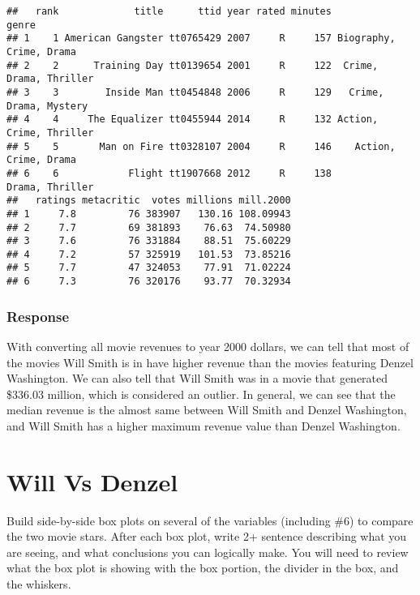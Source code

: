 \documentclass[
]{article}
\newenvironment{Shaded}{\begin{snugshade}}{\end{snugshade}}
\newcommand{\FloatTok}[1]{\textcolor[rgb]{0.00,0.00,0.81}{#1}}
\newcommand{\KeywordTok}[1]{\textcolor[rgb]{0.13,0.29,0.53}{\textbf{#1}}}
\newcommand{\NormalTok}[1]{#1}
\newcommand{\OperatorTok}[1]{\textcolor[rgb]{0.81,0.36,0.00}{\textbf{#1}}}
\begin{document}
\begin{Shaded}
\end{Shaded}

\begin{verbatim}
##   rank             title      ttid year rated minutes                   genre
## 1    1 American Gangster tt0765429 2007     R     157 Biography, Crime, Drama
## 2    2      Training Day tt0139654 2001     R     122  Crime, Drama, Thriller
## 3    3        Inside Man tt0454848 2006     R     129   Crime, Drama, Mystery
## 4    4     The Equalizer tt0455944 2014     R     132 Action, Crime, Thriller
## 5    5       Man on Fire tt0328107 2004     R     146    Action, Crime, Drama
## 6    6            Flight tt1907668 2012     R     138         Drama, Thriller
##   ratings metacritic  votes millions mill.2000
## 1     7.8         76 383907   130.16 108.09943
## 2     7.7         69 381893    76.63  74.50980
## 3     7.6         76 331884    88.51  75.60229
## 4     7.2         57 325919   101.53  73.85216
## 5     7.7         47 324053    77.91  71.02224
## 6     7.3         76 320176    93.77  70.32934
\end{verbatim}

\hypertarget{response-2}{%
\subsubsection{Response}\label{response-2}}

With converting all movie revenues to year 2000 dollars, we can tell
that most of the movies Will Smith is in have higher revenue than the
movies featuring Denzel Washington. We can also tell that Will Smith was
in a movie that generated \$336.03 million, which is considered an
outlier. In general, we can see that the median revenue is the almost
same between Will Smith and Denzel Washington, and Will Smith has a
higher maximum revenue value than Denzel Washington.

\hypertarget{will-vs-denzel}{%
\section{Will Vs Denzel}\label{will-vs-denzel}}

Build side-by-side box plots on several of the variables (including \#6)
to compare the two movie stars. After each box plot, write 2+ sentence
describing what you are seeing, and what conclusions you can logically
make. You will need to review what the box plot is showing with the box
portion, the divider in the box, and the whiskers.
\end{document}

